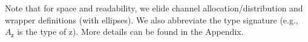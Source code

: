 Note that for space and readability, we elide channel allocation/distribution
and wrapper definitions (with ellipses). We also abbreviate the type signature
(e.g., $A_{\mathsf{z}}$ is the type of \textsf{z}). More details can be found in
the Appendix.

